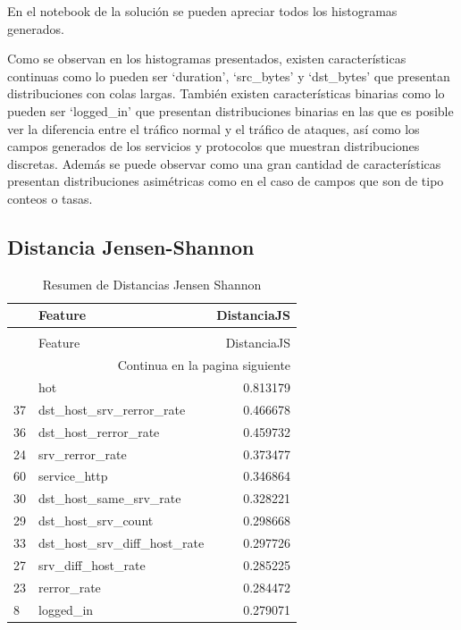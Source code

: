 \documentclass[12pt,a4paper]{article}
\begin{document}
En el notebook de la solución se pueden apreciar todos los histogramas generados.

Como se observan en los histogramas presentados, existen características continuas como lo pueden ser
`duration', `src_bytes' y `dst_bytes' que presentan distribuciones con colas largas.
También existen características binarias como lo pueden ser `logged_in' que presentan distribuciones binarias en las que es posible ver
la diferencia entre el tráfico normal y el tráfico de ataques, así como los campos generados de los servicios y protocolos que muestran distribuciones discretas.
Además se puede observar como una gran cantidad de características presentan distribuciones asimétricas como
en el caso de campos que son de tipo conteos o tasas.

\subsection{Distancia Jensen-Shannon}\label{subsec:distancia-jensen-shannon}

\begin{longtable}{llr}
  \caption{Resumen de Distancias Jensen Shannon} \\
  \toprule
  & Feature & DistanciaJS \\
  \midrule
  \endfirsthead
  \caption[]{Resumen de Distancias Jensen Shannon} \\
  \toprule
  & Feature & DistanciaJS \\
  \midrule
  \endhead
  \midrule
  \multicolumn{3}{r}{Continua en la pagina siguiente} \\
  \midrule
  \endfoot
  \bottomrule
  \endlastfoot
  6 & hot & 0.813179 \\
  37 & dst_host_srv_rerror_rate & 0.466678 \\
  36 & dst_host_rerror_rate & 0.459732 \\
  24 & srv_rerror_rate & 0.373477 \\
  60 & service_http & 0.346864 \\
  30 & dst_host_same_srv_rate & 0.328221 \\
  29 & dst_host_srv_count & 0.298668 \\
  33 & dst_host_srv_diff_host_rate & 0.297726 \\
  27 & srv_diff_host_rate & 0.285225 \\
  23 & rerror_rate & 0.284472 \\
  8 & logged_in & 0.279071 \\
\end{longtable}
\end{document}

